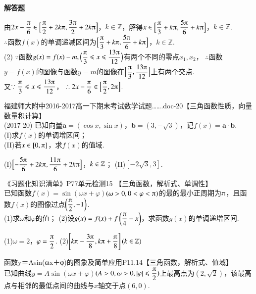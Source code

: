\begin{exercise}{\bf 解答题}
\begin{answer}
        由$2x-\dfrac{\piup}6\in\Bigl[\dfrac{\piup}2+2k\piup,\dfrac{3\piup}2+2k\piup\Bigr]$，${k\in\mathbb{Z}}$，解得$x\in\Bigl[\dfrac{\piup}3+k\piup,\dfrac{5\piup}6+k\piup\Bigr]$，${k\in\mathbb{Z}}$.\\
        $\therefore$函数$f(x)$的单调递减区间为$\Bigl[\dfrac{\piup}3+k\piup,\dfrac{5\piup}6+k\piup\Bigr]$，${k\in\mathbb{Z}}$.\\
        (2) $\because$函数$g(x)=f(x)-m,\Bigl(\dfrac{\piup}3\leqslant x\leqslant\dfrac{13\piup}{12}\Bigr)$有两个不同的零点$x_1,x_2$，
        $\therefore$函数$y=f(x)$的图像与函数$y=m$的图像在$\Bigl[\dfrac{\piup}3,\dfrac{13\piup}{12}\Bigr]$上有两个交点.\\
        又$\because \dfrac{\piup}3\leqslant x\leqslant\dfrac{13\piup}{12}$，
        $\therefore 2x-\dfrac{\piup}6\in\Bigl[\dfrac{\piup}2,2\piup\Bigr]$.
      \end{answer}
    \item 福建师大附中2016-2017高一下期末考试数学试题…….doc-20【三角函数性质，向量数量积计算】\\
      (2017  20)
      已知向量$\bm a=(\cos x,\sin x)$，$\bm b=(3,-\sqrt3)$，记$f(x)=\bm a\cdot\bm b$.\\
      (I)求$f(x)$的单调增区间；\\
      (II)若$x\in[0,\piup]$，求$f(x)$的值域.
      \begin{answer}
        (I)$\Bigl[-\dfrac{5\piup}6+2k\piup,\dfrac{11\piup}6+2k\piup\Bigr]$，$k\in\mathbb{Z}$；
        (II)$[-2\sqrt3,3]$.
      \end{answer}
    \item 《习题化知识清单》P77单元检测15 【三角函数，解析式、单调性】\\
      已知函数$f(x)=\sin(\omega x+\varphi)$$(\omega>0,0<\varphi<\piup)$的最的最小正周期为$\piup$，且函数$f(x)$的图像过点$\left(\dfrac{\piup}2,-1\right)$.\\
      (1)求$\omega$和$\varphi$的值；
      (2)设$g(x)=f(x)+f\left(\dfrac{\piup}4-x \right)$，求函数$g(x)$的单调递增区间.
      \begin{answer}
        (1)$\omega=2$，$\varphi=\dfrac{\piup}2$.
        (2)$\left[k\piup-\dfrac{3\piup}8,k\piup+\dfrac{\piup}8\right](k\in\mathbb{Z})$
      \end{answer}
    \item 函数y＝Asin(ωx＋φ)的图象及简单应用P11.14【三角函数，解析式、值域】\\
      已知曲线$y=A\sin(\omega x+\varphi)$$(A>0,\omega>0,\abs{\varphi}\leqslant\dfrac{\piup}2)$上最高点为$(2,\sqrt{2})$，该最高点与相邻的最低点间的曲线与$x$轴交于点$(6,0)$.\\

\end{exercise}
